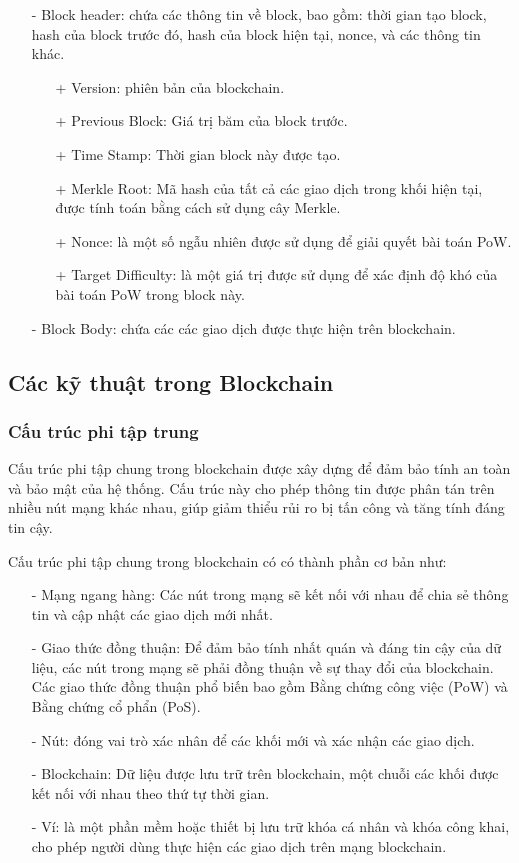 \begin{itemize}
    \item[-] Block header: chứa các thông tin về block, bao gồm: thời gian tạo block, hash của block trước đó, hash của block hiện tại, nonce, và các thông tin khác.
    \begin{itemize}
        \item[+] Version: phiên bản của blockchain.
        \item[+] Previous Block: Giá trị băm của block trước.
        \item[+] Time Stamp: Thời gian block này được tạo.
        \item[+] Merkle Root: Mã hash của tất cả các giao dịch trong khối hiện tại, 
        được tính toán bằng cách sử dụng cây Merkle.
        \item[+] Nonce: là một số ngẫu nhiên được sử dụng để giải quyết bài toán PoW.
        \item[+] Target Difficulty: là một giá trị được sử dụng để xác định độ khó của bài toán PoW trong block này.
    \end{itemize}
    \item[-] Block Body: chứa các các giao dịch được thực hiện trên blockchain.
\end{itemize}

\subsection{Các kỹ thuật trong Blockchain}
\subsubsection{Cấu trúc phi tập trung}

Cấu trúc phi tập chung trong blockchain được xây dựng 
để đảm bảo tính an toàn và bảo mật của hệ thống. Cấu trúc này cho phép thông tin được phân tán trên nhiều nút mạng khác nhau, giúp giảm thiểu rủi ro bị tấn công và tăng tính đáng tin cậy.

Cấu trúc phi tập chung trong blockchain có có thành phần cơ bản như:
\begin{itemize}
    \item[-] Mạng ngang hàng: Các nút trong mạng sẽ kết 
    nối với nhau để chia sẻ thông tin và cập nhật các giao dịch mới nhất.
    \item[-] Giao thức đồng thuận: Để đảm bảo tính nhất 
    quán và đáng tin cậy của dữ liệu, các nút trong mạng sẽ phải đồng thuận về 
    sự thay đổi của blockchain. Các giao thức đồng thuận phổ biến bao gồm Bằng chứng công việc (PoW)
     và Bằng chứng cổ phẩn (PoS).
    \item[-] Nút: đóng vai trò xác nhân để các khối mới và xác nhận các giao dịch.
    \item[-] Blockchain: Dữ liệu được lưu trữ trên blockchain, một chuỗi
    các khối được kết nối với nhau theo thứ tự thời gian.
    \item[-] Ví: là một phần mềm hoặc thiết bị lưu trữ khóa cá nhân và
    khóa công khai, cho phép người dùng thực hiện các giao dịch trên mạng
    blockchain.
\end{itemize}

